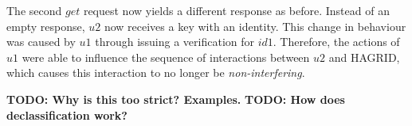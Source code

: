 The second \(get\) request now yields a different response as before. Instead of an empty response, \(u2\) now receives a key with an identity. This change in behaviour was caused by \(u1\) through issuing a verification for \(id1\). Therefore, the actions of \(u1\) were able to influence the sequence of interactions between \(u2\) and HAGRID, which causes this interaction to no longer be \emph{non-interfering}.

\textbf{TODO: Why is this too strict? Examples.}
\textbf{TODO: How does declassification work?}

\newpage

